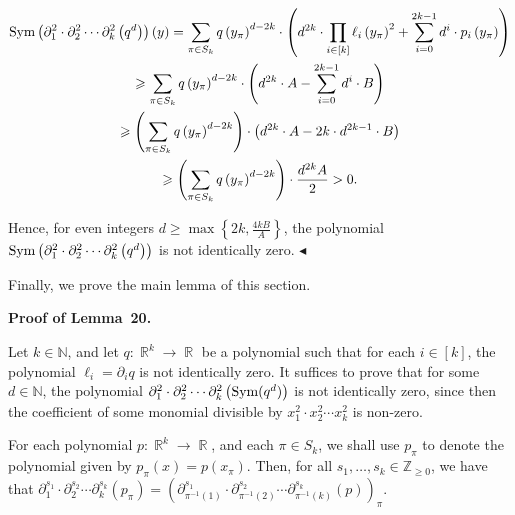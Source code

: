 \[\begin{gathered}
\displaystyle\textnormal{Sym}\left(\partial_{1}^{2}\cdot\partial_{2}^{2}\cdots\partial_{k}^{2}\left(q^{d}\right)\right)(y) \displaystyle=\sum_{\pi\in S_{k}}q\left(y_{\pi}\right)^{d-2k}\cdot\left(d^{2k}\cdot\prod_{i\in[k]}\ell_{i}\left(y_{\pi}\right)^{2}+\sum_{i=0}^{2k-1}d^{i}\cdot p_{i}\left(y_{\pi}\right)\right) \\
\displaystyle\geqslant\sum_{\pi\in S_{k}}q\left(y_{\pi}\right)^{d-2k}\cdot\left(d^{2k}\cdot A-\sum_{i=0}^{2k-1}d^{i}\cdot B\right) \\
\displaystyle\geqslant\left(\sum_{\pi\in S_{k}}q\left(y_{\pi}\right)^{d-2k}\right)\cdot\left(d^{2k}\cdot A-2k\cdot d^{2k-1}\cdot B\right) \\
\displaystyle\geqslant\left(\sum_{\pi\in S_{k}}q\left(y_{\pi}\right)^{d-2k}\right)\cdot\frac{d^{2k}A}{2}>0.
\end{gathered}\]


Hence, for even integers $d\geqslant\max\left\{2k,\frac{4kB}{A}\right\}$, the polynomial $\textnormal{Sym}\left(\partial_{1}^{2}\cdot\partial_{2}^{2}\cdots\partial_{k}^{2}\left(q^{d}\right)\right)$ is not identically zero.
$\blacktriangleleft$\par




Finally, we prove the main lemma of this section.\par





\par\medskip\noindent\textbf{Proof of Lemma 20.}\par




Let $k\in\mathbb{N}$, and let $q:\mathop{\mathbb{R}}^{k}\to\mathop{\mathbb{R}}$ be a polynomial such that for each $i\in[k]$, the polynomial $\ell_{i}=\partial_{i}q$ is not identically zero.
It suffices to prove that for some $d\in\mathbb{N}$, the polynomial $\partial_{1}^{2}\cdot\partial_{2}^{2}\cdots\partial_{k}^{2}\left(\textnormal{Sym}(q^{d})\right)$ is not identically zero, since then the coefficient of some monomial divisible by $x_{1}^{2}\cdot x_{2}^{2}\cdots x_{k}^{2}$ is non-zero.\par




For each polynomial $p:\mathop{\mathbb{R}}^{k}\to\mathop{\mathbb{R}}$, and each $\pi\in S_{k}$, we shall use $p_{\pi}$ to denote the polynomial given by $p_{\pi}(x)=p(x_{\pi})$.
Then, for all $s_{1},\dots,s_{k}\in\mathbb{Z}_{\geqslant 0}$, we have that $\partial_{1}^{s_{1}}\cdot\partial_{2}^{s_{2}}\cdots\partial_{k}^{s_{k}}\left(p_{\pi}\right)=\left(\partial_{\pi^{-1}(1)}^{s_{1}}\cdot\partial_{\pi^{-1}(2)}^{s_{2}}\cdots\partial_{\pi^{-1}(k)}^{s_{k}}\left(p\right)\right)_{\pi}$.\par




